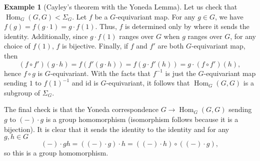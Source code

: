 \documentclass{scrartcl}
\theoremstyle{definition}
\newtheorem{exmp}[thm]{Example}
\theoremstyle{remark}
\DeclareMathOperator{\Hom}{Hom}
\newcommand{\id}{\text{id}}
\begin{document}
\begin{exmp}[Cayley's theorem with the Yoneda Lemma]
Let us check that $\Hom_G(G,G) < \Sigma_G$. Let $f$ be a $G$-equivariant map. For any $g\in G$, we have $f(g) = f(g\cdot 1) = g \cdot f(1)$. Thus, $f$ is determined only by where it sends the identity. Additionally, since $g \cdot f(1)$ ranges over $G$ when $g$ ranges over $G$, for any choice of $f(1)$, $f$ is bijective. Finally, if $f$ and $f'$ are both $G$-equivariant map, then $$(f\circ f')(g\cdot h) = f(f'(g\cdot h)) = f(g \cdot f'(h)) = g\cdot (f\circ f')(h),$$
hence $f\circ g$ is $G$-equivariant. With the facts that $f^{-1}$ is just the $G$-equivariant map sending $1$ to $f(1)^{-1}$ and $\id$ is $G$-equivariant, it follows that $\Hom_G(G,G)$ is a subgroup of $\Sigma_G$.

The final check is that the Yoneda correspondence $G\rightarrow \Hom_G(G,G)$ sending $g$ to $(-)\cdot g$ is a group homomorphism (isomorphism follows because it is a bijection). It is clear that it sends the identity to the identity and for any $g, h \in G$
$$(-)\cdot gh = ((-) \cdot g)\cdot h = ((-)\cdot h) \circ ((-)\cdot g),$$ so this is a group homomorphism. 
\end{exmp}
\end{document}
